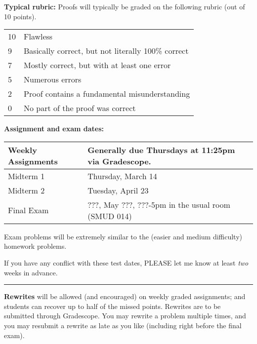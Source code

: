 \documentclass[12pt]{article}
\begin{document}
\vspace*{.15in}
\noindent\textbf{Typical rubric:}
Proofs will typically be graded on the following rubric (out of 10 points).

\begin{center}
 \begin{tabular}{|l|l|}
 \hline
 10& Flawless\\
 9& Basically correct, but not literally 100\% correct\\
 7& Mostly correct, but with at least one error\\
 5& Numerous errors\\
 2& Proof contains a fundamental misunderstanding\\
 0& No part of the proof was correct\\
 \hline
 \end{tabular}
\end{center}

\noindent\textbf{Assignment and exam dates:}

\begin{center}
 \begin{tabular}{|l|l|}
 \hline
 Weekly Assignments & Generally due Thursdays at 11:25pm via Gradescope.\\
 \hline
 Midterm 1 & Thursday, March 14 \\
 Midterm 2 & Tuesday, April 23 \\
   Final Exam & ???, May ???, ???-5pm in the usual room (SMUD 014)	 \\
 \hline
 \end{tabular}
\end{center}

\noindent Exam problems will be extremely similar to the (easier and medium difficulty) homework problems.
\smallskip

\noindent If you have any conflict with these test dates, PLEASE let me know at least \emph{two} weeks in advance.

\smallskip \hrule \medskip

\noindent\textbf{Rewrites} will be allowed (and encouraged) on weekly graded assignments;
 and students can recover up to half of the missed points. Rewrites
 are to be submitted through Gradescope. You may rewrite a problem
 multiple times, and you may resubmit a rewrite as late as you like
 (including right before the final exam).

\medskip
\end{document}

